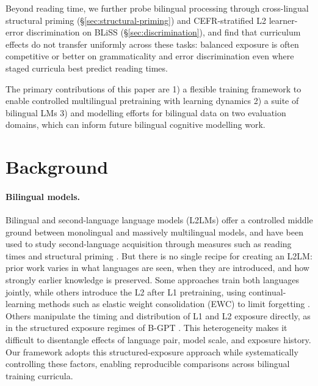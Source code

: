 \documentclass[11pt]{article}
\begin{document}
Beyond reading time, we further probe bilingual processing through cross-lingual structural priming (\S\ref{sec:structural-priming}) and CEFR-stratified L2 learner-error discrimination on BLiSS (\S\ref{sec:discrimination}), and find that curriculum effects do not transfer uniformly across these tasks: balanced exposure is often competitive or better on grammaticality and error discrimination even where staged curricula best predict reading times.

The primary contributions of this paper are 1) a flexible training framework to enable controlled multilingual pretraining with learning dynamics 2) a suite of bilingual LMs 3) and modelling efforts for bilingual data on two evaluation domains, which can inform future bilingual cognitive modelling work.

\section{Background}\label{sec:related}

\paragraph{Bilingual models.}  Bilingual and second-language language models (L2LMs) offer a controlled middle ground between monolingual and massively multilingual models, and have been used to study second-language acquisition through measures such as reading times and structural priming \citep{matusevych-etal-2013-computational, yadavalli-etal-2023-slabert, oba-etal-2023-second, aoyama2024modeling, arnett-etal-2025-acquisition, constantinescu2025investigating, feng2026bilingual}. But there is no single recipe for creating an L2LM: prior work varies in what languages are seen, when they are introduced, and how strongly earlier knowledge is preserved. Some approaches train both languages jointly, while others introduce the L2 after L1 pretraining, using continual-learning methods such as elastic weight consolidation (EWC) to limit forgetting \citep{constantinescu2025investigating}. Others manipulate the timing and distribution of L1 and L2 exposure directly, as in the structured exposure regimes of B-GPT \citep{arnett-etal-2025-acquisition}. This heterogeneity makes it difficult to disentangle effects of language pair, model scale, and exposure history. Our framework adopts this structured-exposure approach while systematically controlling these factors, enabling reproducible comparisons across bilingual training curricula.
\end{document}
